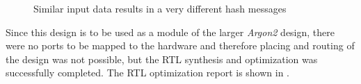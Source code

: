 \documentclass[%
	a4paper,
]
{article}
\begin{document}
\begin{figure}[!ht]
	\centering
	\caption{Similar input data results in a very different hash messages}
	\label{2messagehash}
\end{figure}

Since this design is to be used as a module of the larger \emph{Argon2}
design, there were no ports to be mapped to the hardware and therefore placing
and routing of the design was not possible, but the RTL synthesis and
optimization was successfully completed. The RTL optimization report is shown
in  .
\end{document}

